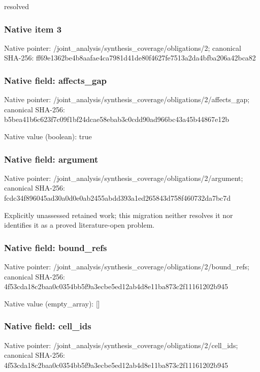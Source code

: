 \documentclass[10pt,a4paper]{article}
\begin{document}
\begingroup\raggedright\sloppy resolved\par\endgroup

\subsubsection{Native item 3}
Native pointer: /joint\_\allowbreak{}analysis/synthesis\_\allowbreak{}coverage/obligations/2; canonical SHA-256: ff69e1362be4b8aafae4ca7981d41de80f4627fe7513a2da4bfba206a42bca82

\subsubsection{Native field: affects\_\allowbreak{}gap}
Native pointer: /joint\_\allowbreak{}analysis/synthesis\_\allowbreak{}coverage/obligations/2/affects\_\allowbreak{}gap; canonical SHA-256: b5bea41b6c623f7c09f1bf24dcae58ebab3c0cdd90ad966bc43a45b44867e12b

Native value (boolean): true

\subsubsection{Native field: argument}
Native pointer: /joint\_\allowbreak{}analysis/synthesis\_\allowbreak{}coverage/obligations/2/argument; canonical SHA-256: fcdc34f896045ad30a0d0e0ab2455abdd393a1ed265843d758f460732da7bc7d

\begingroup\raggedright\sloppy Explicitly unassessed retained work;\allowbreak{} this migration neither resolves it nor identifies it as a proved literature-open problem.\par\endgroup

\subsubsection{Native field: bound\_\allowbreak{}refs}
Native pointer: /joint\_\allowbreak{}analysis/synthesis\_\allowbreak{}coverage/obligations/2/bound\_\allowbreak{}refs; canonical SHA-256: 4f53cda18c2baa0c0354bb5f9a3ecbe5ed12ab4d8e11ba873c2f11161202b945

Native value (empty\_\allowbreak{}array): []

\subsubsection{Native field: cell\_\allowbreak{}ids}
Native pointer: /joint\_\allowbreak{}analysis/synthesis\_\allowbreak{}coverage/obligations/2/cell\_\allowbreak{}ids; canonical SHA-256: 4f53cda18c2baa0c0354bb5f9a3ecbe5ed12ab4d8e11ba873c2f11161202b945
\end{document}
